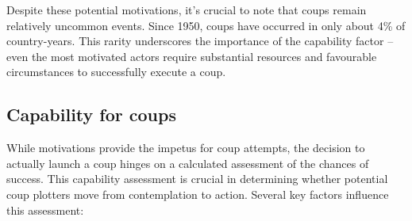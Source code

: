 \documentclass[
  12pt,
]{report}
\begin{document}
Despite these potential motivations, it's crucial to note that coups
remain relatively uncommon events. Since 1950, coups have occurred in
only about 4\% of country-years. This rarity underscores the importance
of the capability factor -- even the most motivated actors require
substantial resources and favourable circumstances to successfully
execute a coup.

\subsection{Capability for coups}\label{capability-for-coups}

While motivations provide the impetus for coup attempts, the decision to
actually launch a coup hinges on a calculated assessment of the chances
of success. This capability assessment is crucial in determining whether
potential coup plotters move from contemplation to action. Several key
factors influence this assessment:
\end{document}
